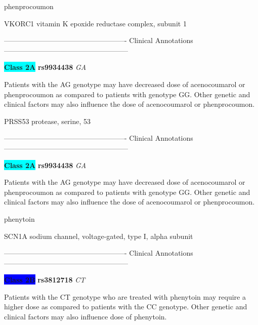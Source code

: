 \documentclass{resume} %
\begin{document}
\begin{rSection}{ phenprocoumon }
\begin{rSubsection}{ VKORC1 }{ vitamin K epoxide reductase complex, subunit 1 }{}{}
\item[] ---------------------------------------------------- Clinical Annotations -----------------------------------------------------\newline
\item \textbf{\colorbox{cyan} {Class 2A}} \textbf{ rs9934438 } \textit{ GA }
\item[] Patients with the AG genotype may have decreased dose of acenocoumarol or phenprocoumon as compared to patients with genotype GG. Other genetic and clinical factors may also influence the dose of acenocoumarol or phenprocoumon.
\end{rSubsection}\begin{rSubsection}{ PRSS53 }{ protease, serine, 53 }{}{}
\item[]

\item[] ---------------------------------------------------- Clinical Annotations -----------------------------------------------------\newline
\item \textbf{\colorbox{cyan} {Class 2A}} \textbf{ rs9934438 } \textit{ GA }
\item[] Patients with the AG genotype may have decreased dose of acenocoumarol or phenprocoumon as compared to patients with genotype GG. Other genetic and clinical factors may also influence the dose of acenocoumarol or phenprocoumon.
\end{rSubsection}

\end{rSection}\begin{rSection}{ phenytoin }
\item[]

\begin{rSubsection}{ SCN1A }{ sodium channel, voltage-gated, type I, alpha subunit }{}{}
\item[]

\item[] ---------------------------------------------------- Clinical Annotations -----------------------------------------------------\newline
\item \textbf{\colorbox{blue} {Class 2B}} \textbf{ rs3812718 } \textit{ CT }
\item[] Patients with the CT genotype who are treated with phenytoin may require a higher dose as compared to patients with the CC genotype. Other genetic and clinical factors may also influence dose of phenytoin.
\end{rSubsection}


\end{rSection}
\end{document}
